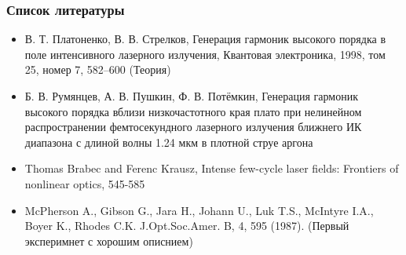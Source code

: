 \documentclass[handout]{beamer}
\begin{document}
\begin{frame}
    \frametitle{Список литературы}
    \begin{itemize}
        \item В. Т. Платоненко, В. В. Стрелков, Генерация гармоник высокого порядка в
        поле интенсивного лазерного излучения, Квантовая электроника, 1998, том 25,
        номер 7, 582–600 (Теория)
        \item Б. В. Румянцев, А. В. Пушкин, Ф. В. Потёмкин, Генерация гармоник высокого порядка вблизи низкочастотного края
        плато при нелинейном распространении фемтосекундного лазерного
        излучения ближнего ИК диапазона с длиной волны 1.24 мкм
        в плотной струе аргона
        \item Thomas Brabec and Ferenc Krausz, Intense few-cycle laser fields: Frontiers of nonlinear optics, 545-585
        \item McPherson A., Gibson G., Jara H., Johann U., Luk T.S., McIntyre
        I.A., Boyer K., Rhodes C.K. J.Opt.Soc.Amer. B, 4, 595 (1987). (Первый эксперимнет с хорошим описнием)
    \end{itemize}
\end{frame}
\end{document}
